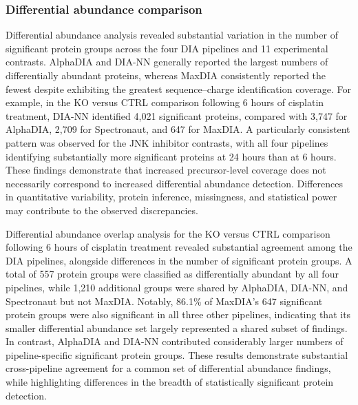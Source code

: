 \documentclass[
  10pt,
]{article}
\begin{document}
\subsubsection{Differential abundance
comparison}\label{differential-abundance-comparison}

Differential abundance analysis revealed substantial variation in the
number of significant protein groups across the four DIA pipelines and
11 experimental contrasts. AlphaDIA and DIA-NN generally reported the
largest numbers of differentially abundant proteins, whereas MaxDIA
consistently reported the fewest despite exhibiting the greatest
sequence--charge identification coverage. For example, in the KO versus
CTRL comparison following 6 hours of cisplatin treatment, DIA-NN
identified 4,021 significant proteins, compared with 3,747 for AlphaDIA,
2,709 for Spectronaut, and 647 for MaxDIA. A particularly consistent
pattern was observed for the JNK inhibitor contrasts, with all four
pipelines identifying substantially more significant proteins at 24
hours than at 6 hours. These findings demonstrate that increased
precursor-level coverage does not necessarily correspond to increased
differential abundance detection. Differences in quantitative
variability, protein inference, missingness, and statistical power may
contribute to the observed discrepancies.

Differential abundance overlap analysis for the KO versus CTRL
comparison following 6 hours of cisplatin treatment revealed substantial
agreement among the DIA pipelines, alongside differences in the number
of significant protein groups. A total of 557 protein groups were
classified as differentially abundant by all four pipelines, while 1,210
additional groups were shared by AlphaDIA, DIA-NN, and Spectronaut but
not MaxDIA. Notably, 86.1\% of MaxDIA's 647 significant protein groups
were also significant in all three other pipelines, indicating that its
smaller differential abundance set largely represented a shared subset
of findings. In contrast, AlphaDIA and DIA-NN contributed considerably
larger numbers of pipeline-specific significant protein groups. These
results demonstrate substantial cross-pipeline agreement for a common
set of differential abundance findings, while highlighting differences
in the breadth of statistically significant protein detection.
\end{document}
